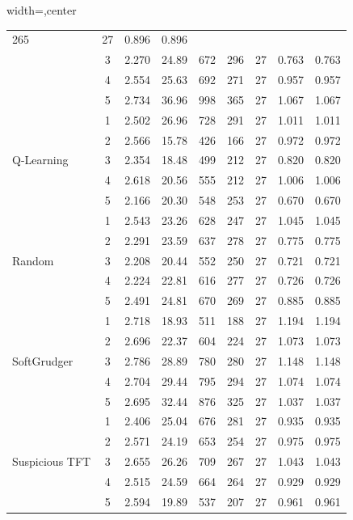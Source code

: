 \begin{table}[htbp]
\begin{adjustbox}{width=\textwidth,center}
\begin{tabular}{|l|c|c|c|c|c|c|c|c|}
265 & 
27 & 
0.896 & 
0.896 \\
 & 
3 & 
2.270 & 
24.89 & 
672 & 
296 & 
27 & 
0.763 & 
0.763 \\
 & 
4 & 
2.554 & 
25.63 & 
692 & 
271 & 
27 & 
0.957 & 
0.957 \\
 & 
5 & 
2.734 & 
36.96 & 
998 & 
365 & 
27 & 
1.067 & 
1.067 \\
\hline
\multirow{5}{*}{Q-Learning} & 
1 & 
2.502 & 
26.96 & 
728 & 
291 & 
27 & 
1.011 & 
1.011 \\
 & 
2 & 
2.566 & 
15.78 & 
426 & 
166 & 
27 & 
0.972 & 
0.972 \\
 & 
3 & 
2.354 & 
18.48 & 
499 & 
212 & 
27 & 
0.820 & 
0.820 \\
 & 
4 & 
2.618 & 
20.56 & 
555 & 
212 & 
27 & 
1.006 & 
1.006 \\
 & 
5 & 
2.166 & 
20.30 & 
548 & 
253 & 
27 & 
0.670 & 
0.670 \\
\hline
\multirow{5}{*}{Random} & 
1 & 
2.543 & 
23.26 & 
628 & 
247 & 
27 & 
1.045 & 
1.045 \\
 & 
2 & 
2.291 & 
23.59 & 
637 & 
278 & 
27 & 
0.775 & 
0.775 \\
 & 
3 & 
2.208 & 
20.44 & 
552 & 
250 & 
27 & 
0.721 & 
0.721 \\
 & 
4 & 
2.224 & 
22.81 & 
616 & 
277 & 
27 & 
0.726 & 
0.726 \\
 & 
5 & 
2.491 & 
24.81 & 
670 & 
269 & 
27 & 
0.885 & 
0.885 \\
\hline
\multirow{5}{*}{SoftGrudger} & 
1 & 
2.718 & 
18.93 & 
511 & 
188 & 
27 & 
1.194 & 
1.194 \\
 & 
2 & 
2.696 & 
22.37 & 
604 & 
224 & 
27 & 
1.073 & 
1.073 \\
 & 
3 & 
2.786 & 
28.89 & 
780 & 
280 & 
27 & 
1.148 & 
1.148 \\
 & 
4 & 
2.704 & 
29.44 & 
795 & 
294 & 
27 & 
1.074 & 
1.074 \\
 & 
5 & 
2.695 & 
32.44 & 
876 & 
325 & 
27 & 
1.037 & 
1.037 \\
\hline
\multirow{5}{*}{Suspicious TFT} & 
1 & 
2.406 & 
25.04 & 
676 & 
281 & 
27 & 
0.935 & 
0.935 \\
 & 
2 & 
2.571 & 
24.19 & 
653 & 
254 & 
27 & 
0.975 & 
0.975 \\
 & 
3 & 
2.655 & 
26.26 & 
709 & 
267 & 
27 & 
1.043 & 
1.043 \\
 & 
4 & 
2.515 & 
24.59 & 
664 & 
264 & 
27 & 
0.929 & 
0.929 \\
 & 
5 & 
2.594 & 
19.89 & 
537 & 
207 & 
27 & 
0.961 & 
0.961 \\

\end{tabular}
\end{adjustbox}
\end{table}
